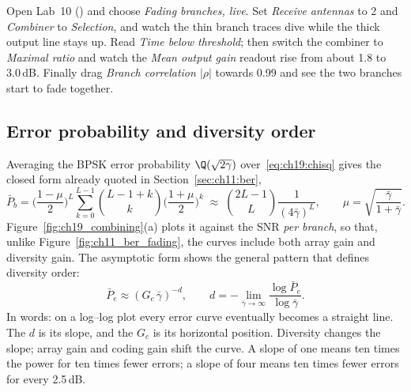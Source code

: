 \begin{tryit}
Open Lab~10 () and choose \emph{Fading branches, live}. Set
\emph{Receive antennas} to 2 and \emph{Combiner} to \emph{Selection}, and watch the thin branch
traces dive while the thick output line stays up. Read \emph{Time below threshold}; then switch the
combiner to \emph{Maximal ratio} and watch the \emph{Mean output gain} readout rise from about 1.8 to 3.0\,dB. Finally
drag \emph{Branch correlation $|\rho|$} towards 0.99 and see the two branches start to fade together.
\end{tryit}

\subsection{Error probability and diversity order}

Averaging the BPSK error probability $\Q(\sqrt{2\gamma})$ over~\eqref{eq:ch19:chisq} gives the
closed form already quoted in Section~\ref{sec:ch11:ber},
\begin{equation}
\bar P_b=\Big(\frac{1-\mu}{2}\Big)^L\sum_{k=0}^{L-1}\binom{L-1+k}{k}\Big(\frac{1+\mu}{2}\Big)^k
\;\approx\;\binom{2L-1}{L}\frac{1}{(4\bar\gamma)^L},
\qquad\mu=\sqrt{\frac{\bar\gamma}{1+\bar\gamma}}.
\label{eq:ch19:mrcber}
\end{equation}
Figure~\ref{fig:ch19_combining}(a) plots it against the SNR \emph{per branch}, so that, unlike
Figure~\ref{fig:ch11_ber_fading}, the curves include both array gain and diversity gain. The
asymptotic form shows the general pattern that defines diversity order:
\begin{equation}
\bar P_e\approx(G_c\,\bar\gamma)^{-d},\qquad
d=-\lim_{\bar\gamma\to\infty}\frac{\log\bar P_e}{\log\bar\gamma}.
\label{eq:ch19:divorder}
\end{equation}
In words: on a log--log plot every error curve eventually becomes a straight line. The
 $d$ is its slope, and the  $G_c$ is its horizontal
position. Diversity changes the slope; array gain and coding gain shift the curve. A slope of one
means ten times the power for ten times fewer errors; a slope of four means ten times fewer errors
for every 2.5\,dB.


